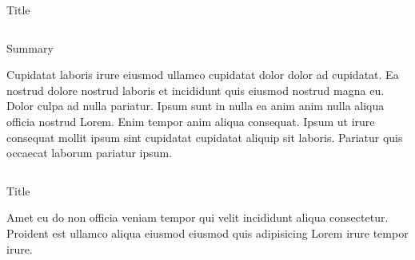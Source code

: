 \documentclass[final]{beamer}
\newlength{\onecolwid}
\newlength{\twocolwid}
\begin{document}
\begin{frame}[t]
\begin{columns}[t]
\begin{column}{\twocolwid}
\begin{columns}[t,totalwidth=\twocolwid]
\begin{column}{\onecolwid}
\begin{block}{Title}
            \end{block}
            
        
        \end{column} %
    
    \end{columns} %
    
    
    \begin{alertblock}{Summary}
    
        Cupidatat laboris irure eiusmod ullamco cupidatat dolor dolor ad cupidatat. Ea nostrud dolore nostrud laboris et incididunt quis eiusmod nostrud magna eu. Dolor culpa ad nulla pariatur. Ipsum sunt in nulla ea anim anim nulla aliqua officia nostrud Lorem. Enim tempor anim aliqua consequat. Ipsum ut irure consequat mollit ipsum sint cupidatat cupidatat aliquip sit laboris. Pariatur quis occaecat laborum pariatur ipsum.
    
    \end{alertblock} 
    
    
    \begin{columns}[t,totalwidth=\twocolwid] %
    
        \begin{column}{\onecolwid} %
        
            
            \begin{block}{Title}
            
                Amet eu do non officia veniam tempor qui velit incididunt aliqua consectetur. Proident est ullamco aliqua eiusmod eiusmod quis adipisicing Lorem irure tempor irure.
            

\end{block}
\end{column}
\end{columns}
\end{column}
\end{columns}
\end{frame}
\end{document}
